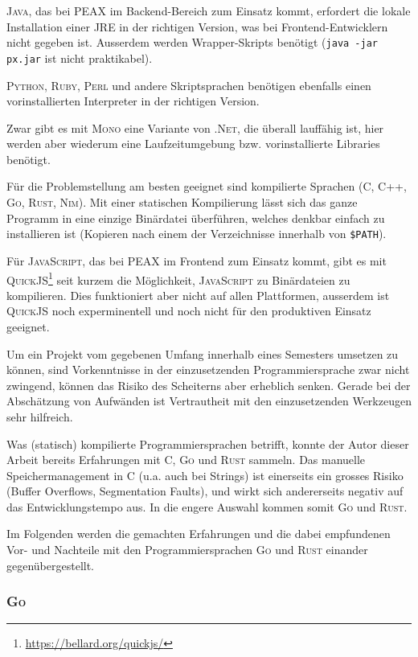 \textsc{Java}, das bei PEAX im Backend-Bereich zum Einsatz kommt, erfordert die lokale Installation einer JRE in der richtigen Version, was bei Frontend-Entwicklern nicht gegeben ist. Ausserdem werden Wrapper-Skripts benötigt (\texttt{java -jar px.jar} ist nicht praktikabel).

\textsc{Python}, \textsc{Ruby}, \textsc{Perl} und andere Skriptsprachen benötigen ebenfalls einen vorinstallierten Interpreter in der richtigen Version.

Zwar gibt es mit \textsc{Mono} eine Variante von \textsc{.Net}, die überall lauffähig ist, hier werden aber wiederum eine Laufzeitumgebung bzw. vorinstallierte Libraries benötigt.

Für die Problemstellung am besten geeignet sind kompilierte Sprachen (C, C++, \textsc{Go}, \textsc{Rust}, \textsc{Nim}). Mit einer statischen Kompilierung lässt sich das ganze Programm in eine einzige Binärdatei überführen, welches denkbar einfach zu installieren ist (Kopieren nach einem der Verzeichnisse innerhalb von \texttt{\$PATH}).

Für \textsc{JavaScript}, das bei PEAX im Frontend zum Einsatz kommt, gibt es mit \textsc{QuickJS}\footnote{\url{https://bellard.org/quickjs/}} seit kurzem die Möglichkeit, \textsc{JavaScript} zu Binärdateien zu kompilieren. Dies funktioniert aber nicht auf allen Plattformen, ausserdem ist \textsc{QuickJS} noch experminentell und noch nicht für den produktiven Einsatz geeignet.

Um ein Projekt vom gegebenen Umfang innerhalb eines Semesters umsetzen zu können, sind Vorkenntnisse in der einzusetzenden Programmiersprache zwar nicht zwingend, können das Risiko des Scheiterns aber erheblich senken. Gerade bei der Abschätzung von Aufwänden ist Vertrautheit mit den einzusetzenden Werkzeugen sehr hilfreich.

Was (statisch) kompilierte Programmiersprachen betrifft, konnte der Autor dieser Arbeit bereits Erfahrungen mit C, \textsc{Go} und \textsc{Rust} sammeln. Das manuelle Speichermanagement in C (u.a. auch bei Strings) ist einerseits ein grosses Risiko (Buffer Overflows, Segmentation Faults), und wirkt sich andererseits negativ auf das Entwicklungstempo aus. In die engere Auswahl kommen somit \textsc{Go} und \textsc{Rust}.

Im Folgenden werden die gemachten Erfahrungen und die dabei empfundenen Vor- und Nachteile mit den Programmiersprachen \textsc{Go} und \textsc{Rust} einander gegenübergestellt.

\subsubsection{\textsc{Go}}

